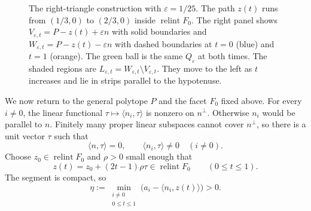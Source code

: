 \documentclass[12pt,reqno,tbtags]{amsart}
\newcommand\inpro[2]{\langle #1,#2\rangle}
\newcommand\1{\mathbbm{1}}
\newcommand{\eps}{\varepsilon}
\begin{document}
\begin{figure}[H]
    \caption{The right-triangle construction with $\eps=1/25$.
    The path $z(t)$ runs from $(1/3,0)$ to $(2/3,0)$ inside
    $\operatorname{relint}F_0$. The right panel shows
    $V_{\eps,t}=P-z(t)+\eps n$ with solid boundaries and
    $W_{\eps,t}=P-z(t)-\eps n$ with dashed boundaries at $t=0$ (blue)
    and $t=1$ (orange). The green ball is the same $Q_\eps$ at both times.
    The shaded regions are $L_{\eps,t}=W_{\eps,t}\setminus V_{\eps,t}$.
    They move to the left as $t$ increases and lie in strips parallel
    to the hypotenuse.}
    \label{fig:triangle-windows}
\end{figure}

We now return to the general polytope $P$ and the facet $F_0$ fixed above.
For every $i\ne0$, the linear functional
$\tau\mapsto\inpro{n_i}{\tau}$ is nonzero on $n^\perp$.
Otherwise $n_i$ would be parallel to $n$. Finitely many proper linear
subspaces cannot cover $n^\perp$, so there is a unit vector $\tau$ such that
\begin{equation*}
    \inpro{n}{\tau}=0,\qquad
    \inpro{n_i}{\tau}\ne0\quad(i\ne0).
\end{equation*}
Choose $z_0\in\operatorname{relint}F_0$ and $\rho>0$ small enough that
\begin{equation*}
    z(t)=z_0+(2t-1)\rho\tau\in\operatorname{relint}F_0
    \qquad(0\le t\le1).
\end{equation*}
The segment is compact, so
\begin{equation}\label{eq:geom-facet-margin}
    \eta:=\min_{\substack{i\ne0\\0\le t\le1}}
       \bigl(a_i-\inpro{n_i}{z(t)}\bigr)>0.
\end{equation}
\end{document}
